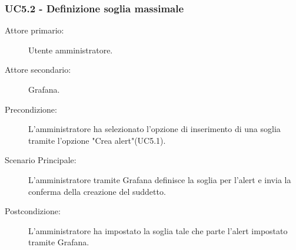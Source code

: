 \subsubsection{UC5.2 - Definizione soglia massimale}
\label{sssec:uc5.2}
\begin{description}
	\item[Attore primario:] Utente amministratore.
	\item[Attore secondario:] Grafana.
	\item[Precondizione:] L'amministratore ha selezionato l'opzione di inserimento di una soglia tramite l'opzione "Crea alert"(UC5.1).
	\item[Scenario Principale:] L'amministratore tramite Grafana definisce la soglia per l'alert e invia la conferma della creazione del suddetto.
	\item[Postcondizione:] L'amministratore ha impostato la soglia tale che parte l'alert impostato tramite Grafana.
\end{description}